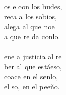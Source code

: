 \begin{cancion}%
	os e con los hudes, \\
	reca a los sobios,\\
	 alega al que noe \\
	a que re da conlo.\\
\jump\\
	ene a  justicia al re\\
	ber al que estáeso,\\
	 coace en el senlo,\\
	 el so, en el peeño.\\
\end{cancion}%
